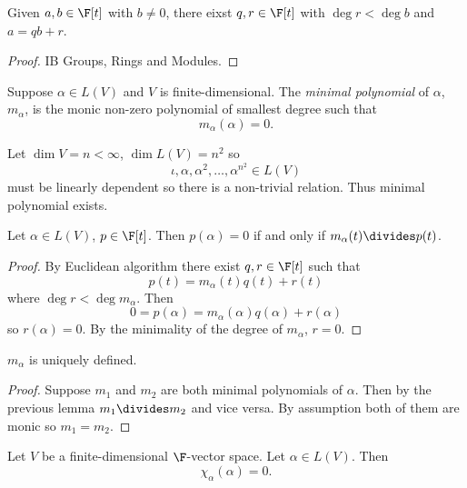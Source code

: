 \documentclass[a4paper]{article}
\theoremstyle{definition}
\begin{document}
\begin{lemma}
  Given \(a, b \in \F[t]\) with \(b \neq 0\), there eixst \(q, r \in \F[t]\) with \(\deg r < \deg b\) and \(a = qb + r\).
\end{lemma}

\begin{proof}
  IB Groups, Rings and Modules.
\end{proof}

\begin{definition}
  Suppose \(\alpha \in L(V)\) and \(V\) is finite-dimensional. The \emph{minimal polynomial} of \(\alpha\), \(m_\alpha\), is the monic non-zero polynomial of smallest degree such that
  \[
    m_\alpha(\alpha) = 0.
  \]
\end{definition}

\begin{remark}
  Let \(\dim V = n < \infty\), \(\dim L(V) = n^2\) so
  \[
    \iota, \alpha, \alpha^2, \dots, \alpha^{n^2} \in L(V)
  \]
  must be linearly dependent so there is a non-trivial relation. Thus minimal polynomial exists.
\end{remark}

\begin{lemma}
  Let \(\alpha \in L(V)\), \(p \in \F[t]\). Then \(p(\alpha) = 0\) if and only if \(m_\alpha(t) \divides p(t)\).
\end{lemma}

\begin{proof}
  By Euclidean algorithm there exist \(q, r \in \F[t]\) such that
  \[
    p(t) = m_\alpha(t) q(t) + r(t)
  \]
  where \(\deg r < \deg m_\alpha\). Then
  \[
    0 = p(\alpha) = m_\alpha(\alpha) q(\alpha) + r(\alpha)
  \]
  so \(r(\alpha) = 0\). By the minimality of the degree of \(m_\alpha\), \(r = 0\).
\end{proof}

\begin{corollary}
  \(m_\alpha\) is uniquely defined.
\end{corollary}

\begin{proof}
  Suppose \(m_1\) and \(m_2\) are both minimal polynomials of \(\alpha\). Then by the previous lemma \(m_1 \divides m_2\) and vice versa. By assumption both of them are monic so \(m_1 = m_2\).
\end{proof}

\begin{theorem}
  Let \(V\) be a finite-dimensional \(\F\)-vector space. Let \(\alpha \in L(V)\). Then
  \[
    \chi_\alpha(\alpha) = 0.
  \]
\end{theorem}
\end{document}
